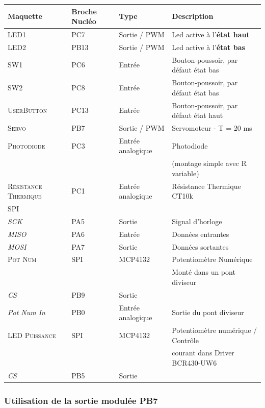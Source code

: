 \documentclass[a4paper,11pt,titlepage]{article} %
\begin{document}
\begin{center}
\begin{tabular}{|l|l|l|l|}
\hline 
Maquette & \textbf{Broche Nucléo} & Type & Description \\ 
\hline 
\textsc{LED1} & PC7 & Sortie / PWM & Led active à l'\textbf{état haut}\\ 
\textsc{LED2} & PB13 & Sortie / PWM & Led active à l'\textbf{état bas}\\ 
\hline 
\textsc{SW1} & PC6 & Entrée & Bouton-poussoir, par défaut état bas\\ 
\textsc{SW2} & PC8 & Entrée & Bouton-poussoir, par défaut état bas\\ 
\textsc{UserButton} & PC13 & Entrée & Bouton-poussoir, par défaut état haut\\
\hline 
\textsc{Servo} & PB7 & Sortie / PWM & Servomoteur - T = 20 ms\\ 
\hline 
\textsc{Photodiode} & PC3 & Entrée analogique & Photodiode \\
 & & & (montage simple avec R variable)\\ 
\hline 
\textsc{Résistance Thermique} & PC1 & Entrée analogique & Résistance Thermique CT10k\\ 
\hline 
\textsc{SPI} & & & \\ 
\textit{SCK} & PA5 & Sortie & Signal d'horloge\\
\textit{MISO} & PA6 & Entrée & Données entrantes\\
\textit{MOSI} & PA7 & Sortie & Données sortantes\\
\hline 
\textsc{Pot Num} & SPI & MCP4132 & Potentiomètre Numérique\\ 
 & & & Monté dans un pont diviseur\\ 
\textit{CS} & PB9 & Sortie & \\ 
\textit{Pot Num In} & PB0 & Entrée analogique & Sortie du pont diviseur\\ 
\hline 
\textsc{LED Puissance} & SPI & MCP4132 & Potentiomètre numérique / Contrôle\\ 
 & & & courant dans Driver BCR430-UW6\\ 
\textit{CS} & PB5 & Sortie & \\
\hline 
\end{tabular} 
\end{center}



\subsubsection{Utilisation de la sortie modulée PB7}
	
\end{document}
